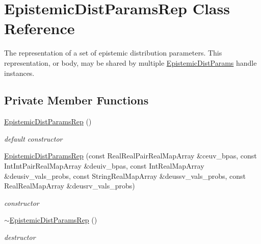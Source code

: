 \section{Epistemic\+Dist\+Params\+Rep Class Reference}
\label{classPecos_1_1EpistemicDistParamsRep}


The representation of a set of epistemic distribution parameters. This representation, or body, may be shared by multiple \hyperlink{classPecos_1_1EpistemicDistParams}{Epistemic\+Dist\+Params} handle instances.  


\subsection*{Private Member Functions}
\begin{DoxyCompactItemize}
\item 
\hyperlink{classPecos_1_1EpistemicDistParamsRep_aa0540ab459e27f052ac00aaa0b8d45c7}{Epistemic\+Dist\+Params\+Rep} ()\label{classPecos_1_1EpistemicDistParamsRep_aa0540ab459e27f052ac00aaa0b8d45c7}

\begin{DoxyCompactList}\small\item\em default constructor \end{DoxyCompactList}\item 
\hyperlink{classPecos_1_1EpistemicDistParamsRep_acb29b99dae9cfb57eba028d27a7de0ab}{Epistemic\+Dist\+Params\+Rep} (const Real\+Real\+Pair\+Real\+Map\+Array \&ceuv\+\_\+bpas, const Int\+Int\+Pair\+Real\+Map\+Array \&deuiv\+\_\+bpas, const Int\+Real\+Map\+Array \&deusiv\+\_\+vals\+\_\+probs, const String\+Real\+Map\+Array \&deussv\+\_\+vals\+\_\+probs, const Real\+Real\+Map\+Array \&deusrv\+\_\+vals\+\_\+probs)\label{classPecos_1_1EpistemicDistParamsRep_acb29b99dae9cfb57eba028d27a7de0ab}

\begin{DoxyCompactList}\small\item\em constructor \end{DoxyCompactList}\item 
\hyperlink{classPecos_1_1EpistemicDistParamsRep_a69939dd1df7f5cf6dc996f723026ac99}{$\sim$\+Epistemic\+Dist\+Params\+Rep} ()\label{classPecos_1_1EpistemicDistParamsRep_a69939dd1df7f5cf6dc996f723026ac99}

\begin{DoxyCompactList}\small\item\em destructor \end{DoxyCompactList}\end{DoxyCompactItemize}
